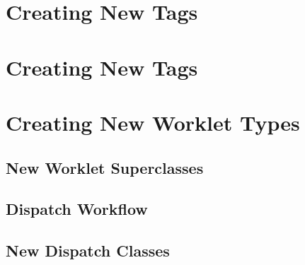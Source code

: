 \section{Creating New \protect\controlsignature Tags}
\label{sec:NewControlSignatureTags}


\section{Creating New \protect\executionsignature Tags}
\label{sec:NewExecutionSignatureTags}


\section{Creating New Worklet Types}
\label{sec:NewWorkletTypes}

\subsection{New Worklet Superclasses}
\label{sec:NewWorkletSuperclasses}

\subsection{Dispatch Workflow}
\label{sec:DispatchWorkflow}

\subsection{New Dispatch Classes}
\label{sec:NewDispatchClasses}
